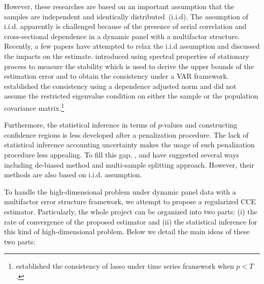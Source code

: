 \documentclass[11pt,a4paper]{article}
\theoremstyle{definition}
\begin{document}
However, these researches are based on an important assumption that the samples are independent and identically distributed~(i.i.d). The assumption of i.i.d. apparently is challenged because of the presence of serial correlation and cross-sectional dependence in a dynamic panel with a multifactor structure.  Recently, a few papers have attempted to relax the i.i.d assumption and discussed the impacts on the estimate. \citet{Basu2015} introduced using spectral properties of stationary process to measure the stability which is used to derive the upper bounds of the estimation error and to obtain the consistency under a VAR framework. \citet{Han2020} established the consistency using a dependence adjusted norm and did not assume the restricted eigenvalue condition on either the sample or the population covariance matrix.\footnote{\citet{Wang2007} established the consistency of lasso under time series framework when $p<T$.}

Furthermore, the statistical inference in terms of $p$-values and constructing confidence regions is less developed after a penalization procedure. The lack of statistical inference accounting uncertainty makes the usage of such penalization procedure less appealing. To fill this gap, \citet{Zhang2014}, \citet{VanDeGeer2014} and \citet{Javanmard2014} have suggested several ways including de-biased method and multi-sample splitting approach. However, their methods are also based on i.i.d. assumption.

To handle the high-dimensional problem under dynamic panel data with a multifactor error structure framework, we attempt to propose a regularized CCE estimator. Particularly, the whole project can be organized into two parts: (i) the rate of convergence of the proposed estimator and (ii) the statistical inference for this kind of high-dimensional problem. Below we detail the main ideas of these two parts:
\end{document}
